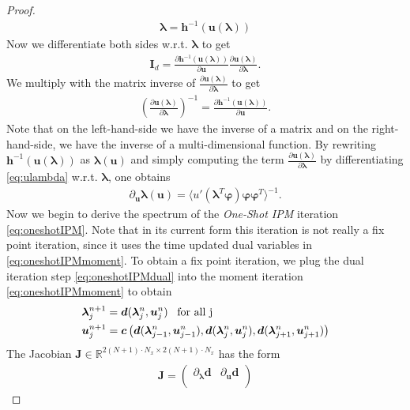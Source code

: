 \begin{proof}
\begin{align}\label{eq:lambdau}
\bm{\lambda} = \bm{h}^{-1}(\bm{u}(\bm{\lambda}))
\end{align}
Now we differentiate both sides w.r.t. $\bm{\lambda}$ to get
\begin{align*}
\bm{I}_{d} = \frac{\partial \bm{h}^{-1}(\bm{u}(\bm{\lambda}))}{\partial \bm{u}}\frac{\partial \bm{u}(\bm{\lambda})}{\partial \bm{\lambda}}.
\end{align*}
We multiply with the matrix inverse of $\frac{\partial \bm{u}(\bm{\lambda})}{\partial \bm{\lambda}}$ to get
\begin{align*}
\left(\frac{\partial \bm{u}(\bm{\lambda})}{\partial \bm{\lambda}}\right)^{-1} = \frac{\partial \bm{h}^{-1}(\bm{u}(\bm{\lambda}))}{\partial \bm{u}}.
\end{align*}
Note that on the left-hand-side we have the inverse of a matrix and on the right-hand-side, we have the inverse of a multi-dimensional function. By rewriting $\bm{h}^{-1}(\bm{u}(\bm{\lambda}))$ as $\bm{\lambda}(\bm{u})$ and simply computing the term $\frac{\partial \bm{u}(\bm{\lambda})}{\partial \bm{\lambda}}$ by differentiating \eqref{eq:ulambda} w.r.t. $\bm{\lambda}$, one obtains
\begin{align}\label{eq:dudlambdaex}
\partial_{\bm{u}} \bm{\lambda}(\bm{u}) = \langle u'(\bm{\lambda}^T\bm{\varphi})\bm{\varphi}\bm{\varphi}^T\rangle^{-1}.
\end{align}
Now we begin to derive the spectrum of the \textit{One-Shot IPM} iteration \eqref{eq:oneshotIPM}. Note that in its current form this iteration is not really a fix point iteration, since it uses the time updated dual variables in \eqref{eq:oneshotIPMmoment}. To obtain a fix point iteration, we plug the dual iteration step \eqref{eq:oneshotIPMdual} into the moment iteration \eqref{eq:oneshotIPMmoment} to obtain
\begin{align*}
&\bm{\lambda}_j^{n+1} = \bm{d}(\bm{\lambda}_j^{n},\bm{u}_j^{n}) \enskip \text{ for all j} \\
&\bm{u}_j^{n+1} =  \bm{c}\left(\bm{d}(\bm{\lambda}_{j-1}^{n},\bm{u}_{j-1}^{n}),\bm{d}(\bm{\lambda}_{j}^{n},\bm{u}_{j}^{n}),\bm{d}(\bm{\lambda}_{j+1}^{n},\bm{u}_{j+1}^{n})\right)
\end{align*}
The Jacobian $\bm{J}\in\mathbb{R}^{2(N+1)\cdot N_x \times 2(N+1)\cdot N_x}$ has the form
\begin{align}\label{eq:Jacobian}
\bm{J} = 
\begin{pmatrix}
 \partial_{\bm{\lambda}} \bm{d} & \partial_{\bm{u}} \bm{d}  \\

\end{pmatrix}
\end{align}
\end{proof}
